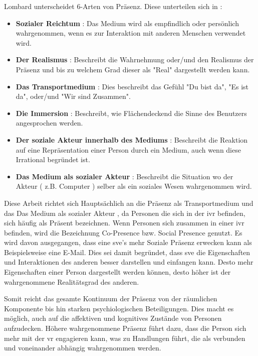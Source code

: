 \documentclass[a4paper,11pt]{article}%
\renewcommand{\\}{\vspace*{0.5\baselineskip} \newline}
\begin{document}
{Lombard unterscheidet 6-Arten von Präsenz. Diese unterteilen sich in :
	\begin{itemize}
		\item \textbf{Sozialer Reichtum} : Das Medium wird als empfindlich oder persönlich wahrgenommen, wenn es zur Interaktion mit anderen Menschen verwendet wird.
		\item \textbf{Der Realismus} : Beschreibt die Wahrnehmung oder/und den Realismus der Präsenz und bis zu welchem Grad dieser als "Real" dargestellt werden kann.
		\item \textbf{Das Transportmedium} : Dies beschreibt das Gefühl "Du bist da", "Es ist da", oder/und "Wir sind Zusammen".
		\item \textbf{Die Immersion} : Beschreibt, wie Flächendeckend die Sinne des Benutzers angesprochen werden.
		\item \textbf{Der soziale Akteur innerhalb des Mediums} : Beschreibt die Reaktion auf eine Repräsentation einer Person durch ein Medium, auch wenn diese Irrational begründet ist.
		\item \textbf{Das Medium als sozialer Akteur} : Beschreibt die Situation wo der Akteur ( z.B. Computer ) selber als ein soziales Wesen wahrgenommen wird.					
				\citep{lombard1997heart}
			\end{itemize}
			Diese Arbeit richtet sich Hauptsächlich an die Präsenz als Transportmedium und das \grqq Das Medium als sozialer Akteur \glqq, da Personen die sich in der \ac{ivr} befinden, sich häufig als \grqq Präsent \glqq bezeichnen. Wenn Personen sich zusammen in einer \ac{ivr} befinden,  wird die Bezeichnung \grqq Co-Presence bzw. Social Presence \glqq genutzt. \citep{schuemie2001research}\\
			Es wird davon ausgegangen, dass eine \ac{sve}'s mehr Soziale Präsenz erwecken kann als Beispielsweise eine E-Mail. Dies sei damit begründet, dass \ac{sve} die Eigenschaften und Interaktionen des anderen besser darstellen und einfangen kann. Desto mehr Eigenschaften einer Person dargestellt werden können, desto höher ist der wahrgenommene Realitätsgrad des anderen. \citep[p. 5-8]{biocca2002defining}
			
Somit reicht das gesamte Kontinuum der Präsenz von der räumlichen Komponente bis hin starken psychiologischen Beteiligungen. Dies macht es möglich, auch auf die affektiven und kognitives Zustände von Personen aufzudecken. Höhere wahrgenommene Präsenz führt dazu, dass die Person sich mehr mit der \ac{vr} engagieren kann, was zu Handlungen führt, die als verbunden und voneinander abhängig wahrgenommen werden. \citep{biocca2001criteria}

}
\end{document}
